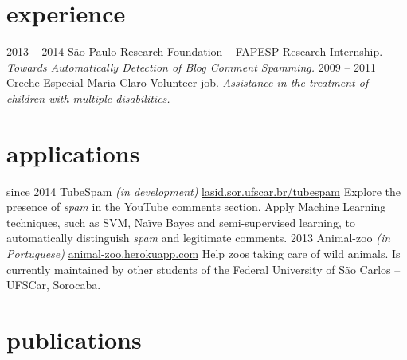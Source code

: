 \documentclass[]{friggeri-cv}
\begin{document}
\section{experience}

\begin{entrylist}
  \entry
    {2013 – 2014}
    {São Paulo Research Foundation – FAPESP}
    {Research Internship.}
    {\emph{Towards Automatically Detection of Blog Comment Spamming.}}
  \entry
    {2009 – 2011}
    {Creche Especial Maria Claro}
    {Volunteer job.}
    {\emph{Assistance in the treatment of children with multiple disabilities.}}
\end{entrylist}

\section{applications}

\begin{entrylist}
  \entry
    {since 2014}
    {TubeSpam \emph{(in development)}}
    {\href{http://lasid.sor.ufscar.br/tubespam}{lasid.sor.ufscar.br/tubespam}}
    {Explore the presence of \emph{spam} in the YouTube comments section. Apply Machine Learning techniques, such as SVM, Na\"ive Bayes and semi-supervised learning, to automatically distinguish \emph{spam} and legitimate comments.}
  \entry
    {2013}
    {Animal-zoo \emph{(in Portuguese)}}
    {\href{http://animal-zoo.herokuapp.com}{animal-zoo.herokuapp.com}}
    {Help zoos taking care of wild animals. Is currently maintained by other students of the Federal University of São Carlos -- UFSCar, Sorocaba.}
\end{entrylist}

\section{publications}


\begin{refsection}
  \nocite{*}
  \printbibliography[sorting=chronological, type=inproceedings, title={international conferences/proceedings}, notkeyword={brazil}, heading=subbibliography]
\end{refsection}
\begin{refsection}
  \nocite{*}
  \printbibliography[sorting=chronological, type=inproceedings, title={local conferences/proceedings}, keyword={brazil}, heading=subbibliography]
\end{refsection}
\end{document}
